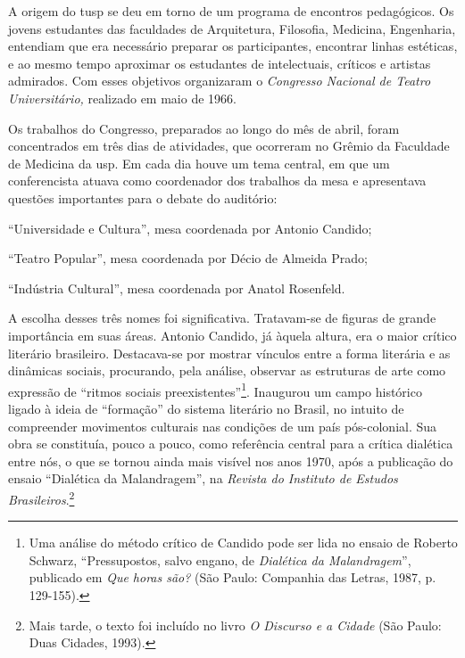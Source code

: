 \subject{Para definir a orientação do grupo e estabelecer parcerias}

A origem do {\sc tusp} se deu em torno de um programa de encontros
pedagógicos. Os jovens estudantes das faculdades de Arquitetura,
Filosofia, Medicina, Engenharia, entendiam que era necessário preparar
os participantes, encontrar linhas estéticas, e ao mesmo tempo aproximar
os estudantes de intelectuais, críticos e artistas admirados. Com esses
objetivos organizaram o {\it Congresso Nacional de Teatro
Universitário,} realizado em maio de 1966.

Os trabalhos do Congresso, preparados ao longo do mês de abril, foram
concentrados em três dias de atividades, que ocorreram no Grêmio da
Faculdade de Medicina da {\sc usp}. Em cada dia houve um tema central, em que
um conferencista atuava como coordenador dos trabalhos da mesa e
apresentava questões importantes para o debate do auditório:

\startitemize[n,packed]
\item
  “Universidade e Cultura”, mesa coordenada por Antonio Candido;
\item
  “Teatro Popular”, mesa coordenada por Décio de Almeida Prado;
\item
  “Indústria Cultural”, mesa coordenada por Anatol Rosenfeld.
\stopitemize

A escolha desses três nomes foi significativa. Tratavam-se de figuras de
grande importância em suas áreas. Antonio Candido, já àquela altura, era
o maior crítico literário brasileiro. Destacava-se por mostrar vínculos
entre a forma literária e as dinâmicas sociais, procurando, pela
análise, observar as estruturas de arte como expressão de “ritmos
sociais preexistentes”\footnote{Uma análise do método crítico de Candido
  pode ser lida no ensaio de Roberto Schwarz, “Pressupostos, salvo
  engano, de {\it Dialética da Malandragem}”, publicado em {\it Que
  horas são?} (São Paulo: Companhia das Letras, 1987, p.\,129-155).}.
Inaugurou um campo histórico ligado à ideia de “formação” do sistema
literário no Brasil, no intuito de compreender movimentos culturais nas
condições de um país pós-colonial. Sua obra se constituía, pouco a
pouco, como referência central para a crítica dialética entre nós, o que
se tornou ainda mais visível nos anos 1970, após a publicação do ensaio
“Dialética da Malandragem”, na {\it Revista do Instituto de Estudos
Brasileiros}.\footnote{Mais tarde, o texto foi incluído no livro {\it O
  Discurso e a Cidade} (São Paulo: Duas Cidades, 1993).}

